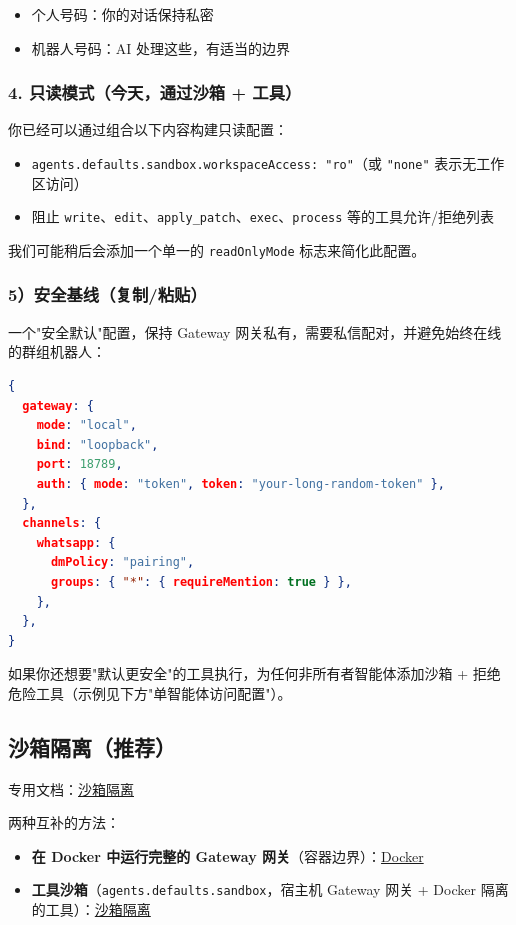 \begin{itemize}
  \item 个人号码：你的对话保持私密
  \item 机器人号码：AI 处理这些，有适当的边界
\end{itemize}


\subsubsection{4. 只读模式（今天，通过沙箱 + 工具）}


你已经可以通过组合以下内容构建只读配置：

\begin{itemize}
  \item \texttt{agents.defaults.sandbox.workspaceAccess: "ro"}（或 \texttt{"none"} 表示无工作区访问）
  \item 阻止 \texttt{write}、\texttt{edit}、\texttt{apply\_patch}、\texttt{exec}、\texttt{process} 等的工具允许/拒绝列表
\end{itemize}


我们可能稍后会添加一个单一的 \texttt{readOnlyMode} 标志来简化此配置。

\subsubsection{5）安全基线（复制/粘贴）}


一个"安全默认"配置，保持 Gateway 网关私有，需要私信配对，并避免始终在线的群组机器人：

\begin{lstlisting}[language=json]
{
  gateway: {
    mode: "local",
    bind: "loopback",
    port: 18789,
    auth: { mode: "token", token: "your-long-random-token" },
  },
  channels: {
    whatsapp: {
      dmPolicy: "pairing",
      groups: { "*": { requireMention: true } },
    },
  },
}
\end{lstlisting}


如果你还想要"默认更安全"的工具执行，为任何非所有者智能体添加沙箱 + 拒绝危险工具（示例见下方"单智能体访问配置"）。

\subsection{沙箱隔离（推荐）}


专用文档：\href{/gateway/sandboxing}{沙箱隔离}

两种互补的方法：

\begin{itemize}
  \item \textbf{在 Docker 中运行完整的 Gateway 网关}（容器边界）：\href{/install/docker}{Docker}
  \item \textbf{工具沙箱}（\texttt{agents.defaults.sandbox}，宿主机 Gateway 网关 + Docker 隔离的工具）：\href{/gateway/sandboxing}{沙箱隔离}
\end{itemize}


